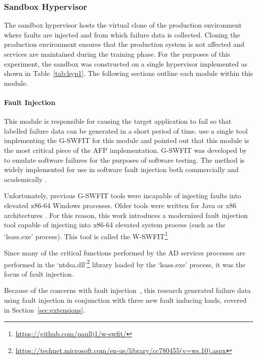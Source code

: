 \subsubsection{Sandbox Hypervisor} \label{sec:sandbox}
The sandbox hypervisor hosts the virtual clone of the production environment
where faults are injected and from which failure data is collected.  Cloning
the production environment ensures that the production system is not affected
and services are maintained during the training phase.  For the purposes of
this experiment, the sandbox was constructed on a single hypervisor implemented
as shown in Table~\ref{tab:hyp1}.  The following sections outline each module
within this module.

\paragraph{Fault Injection} \label{sec:faultInjectionTool} 
This module is responsible for causing the target application to fail so that
labelled failure data can be generated in a short period of time.
\citet{irrera2015} use a single tool implementing the \ac{G-SWFIT} for this
module and pointed out that this module is the most critical piece of the
\ac{AFP} implementation.  \ac{G-SWFIT} was developed by \citet{gswfit} to
emulate software failures for the purposes of software testing.  The method is
widely implemented for use in software fault injection both commercially and
academically \citep{cotroneo2012,irrera2014,natella2010,umadevi2015}. 

Unfortunately, previous \ac{G-SWFIT} tools were incapable of injecting faults
into elevated x86-64 Windows processes.  Older tools were written for Java or
x86 architectures \citep{gswfit,martins2002jaca,natella2010,sanches2011jswfit}.
For this reason, this work introduces a modernized fault injection tool capable
of injecting into x86-64 elevated system process (such as the `lsass.exe'
process).  This tool is called the
\ac{W-SWFIT}\footnote{\url{https://github.com/paullj1/w-swfit/}} 

Since many of the critical functions performed by the \ac{AD} services
processes are performed in the
`ntdsa.dll'\footnote{\url{https://technet.microsoft.com/en-us/library/cc780455(v=ws.10).aspx}}
library loaded by the `lsass.exe' process, it was the focus of fault injection.

Because of the concerns with fault
injection~\citep{cotroneo2012,kikuchi2014,natella2010}, this research generated
failure data using fault injection in conjunction with three new fault inducing
loads, covered in Section~\ref{sec:extensions}.

